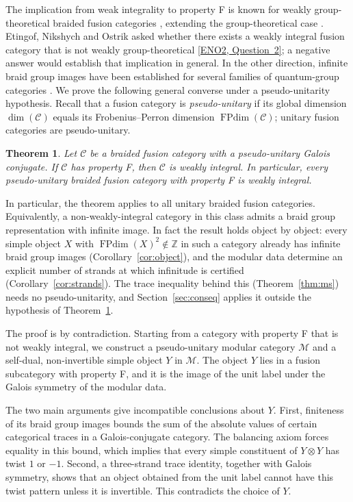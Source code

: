 \documentclass[11pt,oneside]{amsart}
\newtheorem{theorem}{Theorem}[section]
\theoremstyle{remark}
\newcommand{\C}{\mathcal C}
\newcommand{\M}{\mathcal M}
\newcommand{\FP}{\operatorname{FPdim}}
\newcommand{\Z}{\mathbb Z}
\newcommand{\sourcecite}[3]{\nocite{#1}\href{#3}{[#1, #2]}}
\begin{document}
The implication from weak integrality to property F is known for weakly
group-theoretical braided fusion categories \cite[Theorem~7.2]{GN}, extending the
group-theoretical case \cite{ERW}. Etingof, Nikshych and Ostrik asked whether there
exists a weakly integral fusion category that is not weakly group-theoretical
\sourcecite{ENO2}{Question~2}{https://arxiv.org/html/0809.3031\#S11.p3.1.1}; a
negative answer would establish that implication in general. In the other direction, infinite braid group images have
been established for several families of quantum-group categories
\cite{FLW,LRW}. We prove the following general converse under a
pseudo-unitarity hypothesis. Recall that a fusion category is
\emph{pseudo-unitary} if its global dimension $\dim(\C)$ equals its
Frobenius--Perron dimension $\FP(\C)$; unitary fusion categories are
pseudo-unitary.

\begin{theorem}\label{thm:main}
Let $\C$ be a braided fusion category with a pseudo-unitary Galois conjugate.
If $\C$ has property F, then $\C$ is weakly integral. In particular, every
pseudo-unitary braided fusion category with property F is weakly integral.
\end{theorem}

In particular, the theorem applies to all unitary braided fusion categories. Equivalently, a non-weakly-integral category
in this class admits a braid group representation with infinite image. In fact
the result holds object by object: every simple object $X$ with
$\FP(X)^2\notin\Z$ in such a category already has infinite braid group images
(Corollary~\ref{cor:object}), and the modular data determine an explicit number
of strands at which infinitude is certified (Corollary~\ref{cor:strands}).
The trace inequality behind this (Theorem~\ref{thm:ms}) needs no pseudo-unitarity,
and Section~\ref{sec:conseq} applies it outside the hypothesis of Theorem~\ref{thm:main}.

The proof is by contradiction. Starting from a category with property F that is
not weakly integral, we construct a pseudo-unitary modular category $\M$ and a
self-dual, non-invertible simple object $Y$ in $\M$. The object $Y$ lies in a
fusion subcategory with property F, and it is the image of the unit label under
the Galois symmetry of the modular data.

The two main arguments give incompatible conclusions about $Y$. First,
finiteness of its braid group images bounds the sum of the absolute values of
certain categorical traces in a Galois-conjugate category. The balancing axiom
forces equality in this bound, which implies that every simple constituent of
$Y\otimes Y$ has twist $1$ or $-1$. Second, a three-strand trace identity,
together with Galois symmetry, shows that an object obtained from the unit label
cannot have this twist pattern unless it is invertible. This contradicts the
choice of $Y$.
\end{document}
